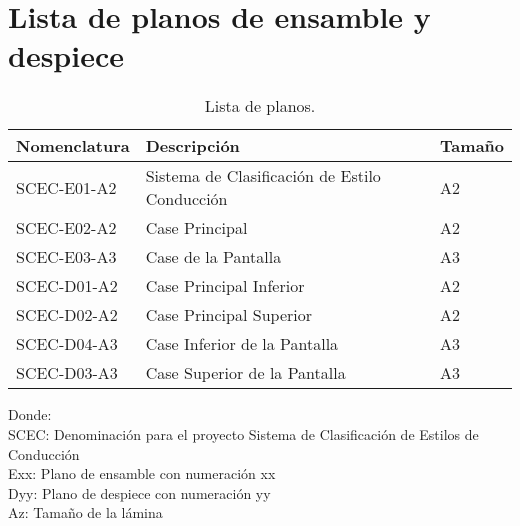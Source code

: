 \chapter{Lista de planos de ensamble y despiece}
\label{anexo:planos}
 \graphicspath{{Appendix4/Figuras/}{Appendix4/Figs/PDF/}{Appendix4/Figs/}}


\bgroup
\def\arraystretch{1.5}%
\begin{table}[htbp!]
\centering
\caption[Lista de planos]{Lista de planos.}
\begin{tabular}{@{}lll@{}}
\toprule
Nomenclatura & Descripción & Tamaño \\ \midrule
SCEC-E01-A2 & Sistema de Clasificación de Estilo Conducción & A2 \\
SCEC-E02-A2 & Case Principal & A2 \\
SCEC-E03-A3 & Case de la Pantalla & A3 \\
SCEC-D01-A2 & Case Principal Inferior & A2 \\
SCEC-D02-A2 & Case Principal Superior & A2 \\
SCEC-D04-A3 & Case Inferior de la Pantalla & A3 \\
SCEC-D03-A3 & Case Superior de la Pantalla & A3 \\ \bottomrule
\end{tabular}
\end{table}
\egroup

Donde: \\
SCEC: Denominación para el proyecto Sistema de Clasificación de Estilos de Conducción\\
Exx: Plano de ensamble con numeración xx \\
Dyy: Plano de despiece con numeración yy\\
Az: Tamaño de la lámina\\
